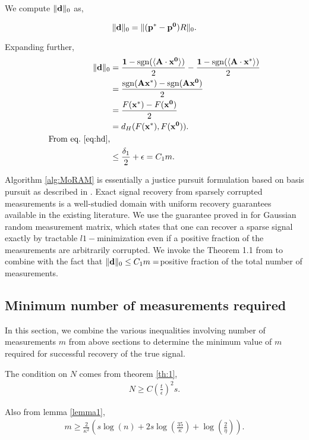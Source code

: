 We compute $\|\mathbf{d}\|_0$ as,

$$
\|\mathbf{d}\|_0 =  \|(\mathbf{p^*-p^0})R\|_0.
$$

Expanding further,
\begin{align*}
\|\mathbf{d}\|_0  & = \frac{\mathbf{1}-\mathrm{sgn}(\langle \mathbf{A} \cdot \mathbf{x^0} \rangle)}{2} -  \frac{\mathbf{1}-\mathrm{sgn}(\langle \mathbf{A} \cdot \mathbf{x^*} \rangle)}{2} \\
& = \frac{\mathrm{sgn}({\mathbf{Ax^*}})- \mathrm{sgn}({\mathbf{Ax^0}})}{2} \\
& = \frac{F\mathbf{(x^*)} - F\mathbf{(x^0)}}{2} \\
& = d_H(F\mathbf{(x^*)}, F\mathbf{(x^0)}). \\
\textnormal{From eq.~\ref{eq:hd},} \\
& \leq \frac{\delta_1}{2} + \epsilon = C_1m.
\end{align*}

Algorithm \ref{alg:MoRAM} is essentially a justice pursuit formulation based on basis pursuit as described in \cite{Laska2009}. Exact signal recovery from sparsely corrupted measurements is a well-studied domain with uniform recovery guarantees available in the existing literature. We use the guarantee proved in \cite{li2013compressed} for Gaussian random measurement matrix, which states that one can recover a sparse signal exactly by tractable $\mathit{l}1-$minimization even if a positive fraction of the measurements are arbitrarily corrupted. We invoke the Theorem 1.1 from \cite{li2013compressed} to combine with the fact that $\|\mathbf{d}\|_0 \leq C_1m =$positive fraction of the total number of measurements.


\subsection{Minimum number of measurements required}
In this section, we combine the various inequalities involving number of measurements $m$ from above sections to determine the minimum value of $m$ required for successful recovery of the true signal.

The condition on $N$ comes from theorem \ref{th:1},
\begin{align}
N \geq C\left(\frac{t}{\epsilon}\right)^2s.
\label{eq:ineq1}
\end{align}

Also from lemma \ref{lemma1},
\begin{align}
m \geq \frac{2}{\kappa^2}\left(s\log{(n)} + 2s\log{\left(\frac{35}{\kappa}\right)}+\log{\left(\frac{2}{\eta}\right)}\right).
\label{eq:ineq2}
\end{align}

